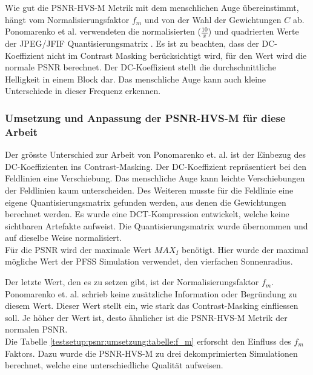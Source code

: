 Wie gut die PSNR-HVS-M Metrik mit dem menschlichen Auge übereinstimmt, hängt vom Normalisierungsfaktor $f_m$ und von der Wahl der Gewichtungen $C$ ab. Ponomarenko et al. verwendeten die normalisierten ($\frac{10}{x}$) und quadrierten Werte der JPEG/JFIF Quantisierungsmatrix \cite{wallace1992jpeg}. Es ist zu beachten, dass der DC-Koeffizient nicht im Contrast Masking berücksichtigt wird, für den Wert wird die normale PSNR berechnet. Der DC-Koeffizient stellt die durchschnittliche Helligkeit in einem Block dar. Das menschliche Auge kann auch kleine Unterschiede in dieser Frequenz erkennen.

\subsubsection{Umsetzung und Anpassung der PSNR-HVS-M für diese Arbeit}
Der grösste Unterschied zur Arbeit von Ponomarenko et. al. ist der Einbezug des DC-Koeffizienten ins Contrast-Masking. Der DC-Koeffizient repräsentiert bei den Feldlinien eine Verschiebung. Das menschliche Auge kann leichte Verschiebungen der Feldlinien kaum unterscheiden. Des Weiteren musste für die Feldlinie eine eigene Quantisierungsmatrix gefunden werden, aus denen die Gewichtungen berechnet werden. Es wurde eine DCT-Kompression entwickelt, welche keine sichtbaren Artefakte aufweist. Die Quantisierungsmatrix wurde übernommen und auf dieselbe Weise normalisiert.\\
Für die PSNR wird der maximale Wert $MAX_I$ benötigt. Hier wurde der maximal mögliche Wert der PFSS Simulation verwendet, den vierfachen Sonnenradius.

Der letzte Wert, den es zu setzen gibt, ist der Normalisierungsfaktor $f_m$. Ponomarenko et. al. schrieb keine zusätzliche Information oder Begründung zu diesem Wert. Dieser Wert stellt ein, wie stark das Contrast-Masking einfliessen soll. Je höher der Wert ist, desto ähnlicher ist die PSNR-HVS-M Metrik der normalen PSNR.\\
Die Tabelle \ref{testsetup:psnr:umsetzung:tabelle:f_m} erforscht den Einfluss des $f_m$ Faktors. Dazu wurde die PSNR-HVS-M zu drei dekomprimierten Simulationen berechnet, welche eine unterschiedliche Qualität aufweisen.

